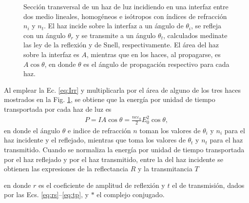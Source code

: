 \begin{figure}[h]
	\caption{Sección transversal de un haz de luz incidiendo en una interfaz entre dos medio lineales, homogéneos e isótropos con índices de refracción $n_i$ y $n_t$. El haz incide sobre la interfaz a un ángulo de $\theta_i$, se refleja con un ángulo $\theta_r$ y se transmite a un ángulo $\theta_t$, calculados medinate las ley de la reflexión y de Snell, respectivamente. El área del haz sobre la interfaz es $A$, mientras que en los haces, al propagarse, es $A\cos\theta$, en donde $\theta$ es el ángulo de propagación respectivo para cada haz.} \label{fig:hazcircular}
	\end{figure}

 Al emplear la Ec. \eqref{eq:Irr} y multiplicarla por el área de alguno de los tres haces mostrados en la Fig. \ref{fig:hazcircular}, se obtiene que la energía por unidad de tiempo transportada por cada haz de luz es
	\begin{align*}
	P = I A \cos\theta = \frac{n c \varepsilon_0}{2} E_{0}^2 \cos\theta,
	\end{align*}
en donde el ángulo $\theta$ e indice de refracción $n$ toman los valores de $\theta_i$ y $n_i$ para el haz incidente y el reflejado, mientras que  toma los valores de $\theta_t$ y  $n_t$ para el haz transmitido. Cuando se normaliza la energía por unidad de tiempo transportada por el haz reflejado y por el haz transmitido, entre la del haz incidente se obtienen las expresiones de la reflectancia $R$ y la transmitancia $T$ \vspace{-.5em}
	\begin{tcolorbox}[title = Reflectancia y transmitancia]
	\end{tcolorbox}	 \vspace*{-.5em}\noindent	
en donde $r$ es el coeficiente de amplitud de reflexión y $t$ el de transmisión, dados por las Ecs. \eqref{eq:rs}--\eqref{eq:tp}, y $*$ el complejo conjugado.

